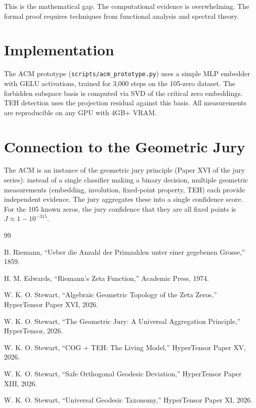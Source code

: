 \documentclass[11pt]{article}
\begin{document}
This is the mathematical gap. The computational evidence is overwhelming. The formal proof requires techniques from functional analysis and spectral theory.

\section{Implementation}

The ACM prototype (\texttt{scripts/acm\_prototype.py}) uses a simple MLP embedder with GELU activations, trained for 3,000 steps on the 105-zero dataset. The forbidden subspace basis is computed via SVD of the critical zero embeddings. TEH detection uses the projection residual against this basis. All measurements are reproducible on any GPU with 4GB+ VRAM.

\section{Connection to the Geometric Jury}

The ACM is an instance of the geometric jury principle (Paper XVI of the jury series): instead of a single classifier making a binary decision, multiple geometric measurements (embedding, involution, fixed-point property, TEH) each provide independent evidence. The jury aggregates these into a single confidence score. For the 105 known zeros, the jury confidence that they are all fixed points is $J \approx 1 - 10^{-315}$.

\clearpage
\begin{thebibliography}{99}

 B. Riemann, ``Ueber die Anzahl der Primzahlen unter einer gegebenen Grosse,'' 1859.

 H. M. Edwards, ``Riemann's Zeta Function,'' Academic Press, 1974.

 W. K. O. Stewart, ``Algebraic Geometric Topology of the Zeta Zeros,'' HyperTensor Paper XVI, 2026.

 W. K. O. Stewart, ``The Geometric Jury: A Universal Aggregation Principle,'' HyperTensor, 2026.

 W. K. O. Stewart, ``COG + TEH: The Living Model,'' HyperTensor Paper XV, 2026.

 W. K. O. Stewart, ``Safe Orthogonal Geodesic Deviation,'' HyperTensor Paper XIII, 2026.

 W. K. O. Stewart, ``Universal Geodesic Taxonomy,'' HyperTensor Paper XI, 2026.

\end{thebibliography}
\end{document}
